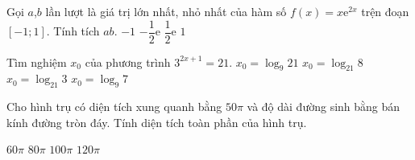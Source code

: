\begin{ex}%
	Gọi $a$,$b$ lần lượt là giá trị lớn nhất, nhỏ nhất của hàm số $f(x)=x\mathrm{e}^{2x}$ trện đoạn $[-1;1]$. Tính tích $ab$.
	\choice
	{$-1$}
	{\True$-\dfrac{1}{2}\mathrm{e}$}
	{$\dfrac{1}{2}\mathrm{e}$}
	{ $1$}
\end{ex}

\begin{ex}%
	Tìm nghiệm $x_0$ của phương trình $3^{2x+1}=21$.
	\choice
	{$x_0=\log_{9}21$}
	{$x_0=\log_{21}8$}
	{$x_0=\log_{21}3$}
	{\True $x_0=\log_{9}7$}
	
\end{ex} 

\begin{ex}%
	Cho hình trụ có diện tích xung quanh bằng $50\pi$ và độ dài đường sinh bằng bán kính đường tròn đáy. Tính diện tích toàn phần của hình trụ.
	
	\choice
	{$60\pi$}
	{$80\pi$}
	{\True $100\pi$}
	{ $120\pi$}
	
\end{ex} 

